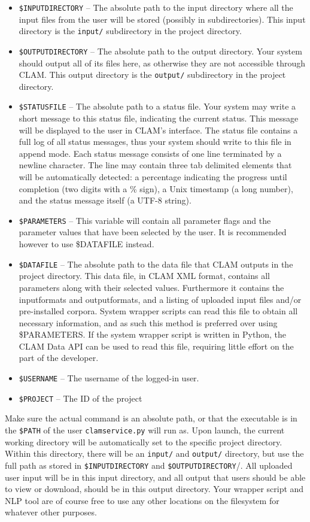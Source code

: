 \documentclass[a4paper,12pt]{report}
\begin{document}
\begin{itemize}
\item \texttt{\$INPUTDIRECTORY} -- The absolute path to the input directory where all the input files from the user will be stored (possibly in subdirectories). This input directory is the \texttt{input/} subdirectory in the project directory.
\item \texttt{\$OUTPUTDIRECTORY} -- The absolute path to the output directory. Your system should output all of its files here, as otherwise they are not accessible through CLAM.  This output directory is the \texttt{output/} subdirectory in the project directory.
\item \texttt{\$STATUSFILE} -- The absolute path to a status file. Your system may write a short message to this status file, indicating the current status. This message will be displayed to the user in CLAM's interface. The status file contains a full log of all status messages, thus your system should write to this file in append mode. Each status message consists of one line terminated by a newline character. The line may contain three tab delimited elements that will be automatically detected: a percentage indicating the progress until completion (two digits with a \% sign), a Unix timestamp (a long number), and the status message itself (a UTF-8 string).
\item \texttt{\$PARAMETERS} -- This variable will contain all parameter flags and the parameter values that have been selected by the user. It is recommended however to use \$DATAFILE instead.  
\item \texttt{\$DATAFILE} -- The absolute path to the data file that CLAM outputs in the project directory. This data file, in CLAM XML format, contains all parameters along with their selected values. Furthermore it contains the inputformats and outputformats, and a listing of uploaded input files and/or pre-installed corpora. System wrapper scripts can read this file to obtain all necessary information, and as such this method is preferred over using \$PARAMETERS. If the system wrapper script is written in Python, the CLAM Data API can be used to read this file, requiring little effort on the part of the developer. 
\item \texttt{\$USERNAME} -- The username of the logged-in user.
\item \texttt{\$PROJECT} -- The ID of the project
\end{itemize}


Make sure the actual command is an absolute path, or that the executable is in
the \texttt{\$PATH} of the user \texttt{clamservice.py} will run as. Upon
launch, the current working directory will be automatically set to the specific
project directory. Within this directory, there will be an \texttt{input/} and
\texttt{output/} directory, but use the full path as stored in
\texttt{\$INPUTDIRECTORY} and \texttt{\$OUTPUTDIRECTORY}/. All uploaded user
input will be in this input directory, and all output that users should be able
to view or download, should be in this output directory. Your wrapper script
and NLP tool are of course free to use any other locations on the filesystem
for whatever other purposes.
\end{document}
